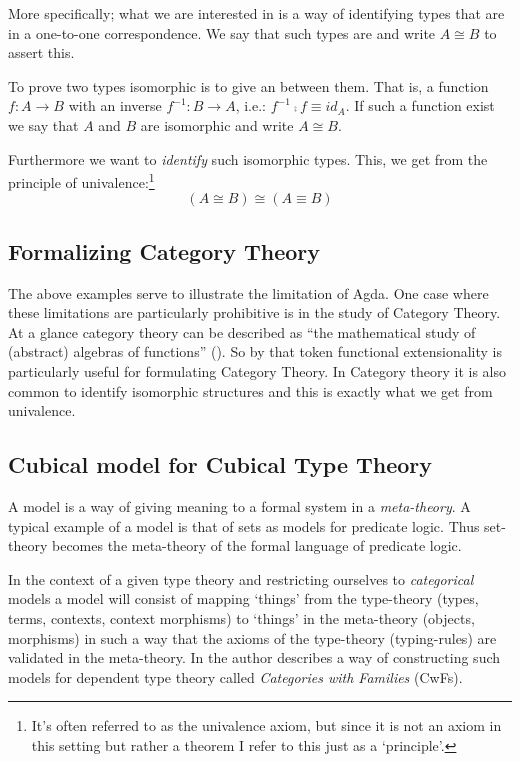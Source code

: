 More specifically; what we are interested in is a way of identifying types that
are in a one-to-one correspondence. We say that such types are
 and write $A \cong B$ to assert this.

To prove two types isomorphic is to give an  between them.
That is, a function $f : A \to B$ with an inverse $f^{-1} : B \to A$, i.e.:
$f^{-1} \comp f \equiv id_A$. If such a function exist we say that $A$ and $B$
are isomorphic and write $A \cong B$.

Furthermore we want to \emph{identify} such isomorphic types. This, we get from
the principle of univalence:\footnote{It's often referred to as the univalence
axiom, but since it is not an axiom in this setting but rather a theorem I
refer to this just as a `principle'.}
%
$$(A \cong B) \cong (A \equiv B)$$
%
\subsection{Formalizing Category Theory}
%
The above examples serve to illustrate the limitation of Agda. One case where
these limitations are particularly prohibitive is in the study of Category
Theory. At a glance category theory can be described as ``the mathematical study
of (abstract) algebras of functions'' (\cite{awodey-2006}). So by that token
functional extensionality is particularly useful for formulating Category
Theory. In Category theory it is also common to identify isomorphic structures
and this is exactly what we get from univalence.

\subsection{Cubical model for Cubical Type Theory}
%
A model is a way of giving meaning to a formal system in a \emph{meta-theory}. A
typical example of a model is that of sets as models for predicate logic. Thus
set-theory becomes the meta-theory of the formal language of predicate logic.

In the context of a given type theory and restricting ourselves to
\emph{categorical} models a model will consist of mapping `things' from the
type-theory (types, terms, contexts, context morphisms) to `things' in the
meta-theory (objects, morphisms) in such a way that the axioms of the
type-theory (typing-rules) are validated in the meta-theory. In
\cite{dybjer-1995} the author describes a way of constructing such models for
dependent type theory called \emph{Categories with Families} (CwFs).

